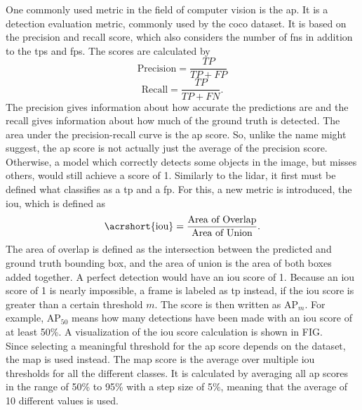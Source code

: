 One commonly used metric in the field of computer vision is the \gls{ap}.
It is a detection evaluation metric, commonly used by the \gls{coco} dataset.
It is based on the precision and recall score, which also considers the number of \glspl{fn} in addition to the \glspl{tp} and \glspl{fp}.
The scores are calculated by
\begin{equation}
	\text{Precision} = \frac{TP}{TP+FP}
\end{equation}
\begin{equation}
	\text{Recall} = \frac{TP}{TP+FN}.
\end{equation}
The precision gives information about how accurate the predictions are and the recall gives information about how much of the ground truth is detected.
The area under the precision-recall curve is the \gls{ap} score.
So, unlike the name might suggest, the \gls{ap} score is not actually just the average of the precision score.
Otherwise, a model which correctly detects some objects in the image, but misses others, would still achieve a score of 1.
Similarly to the \gls{lidar}, it first must be defined what classifies as a \gls{tp} and a \gls{fp}.
For this, a new metric is introduced, the \gls{iou}, which is defined as
\begin{equation}
	\text{\acrshort{iou}} = \frac{\text{Area of Overlap}}{\text{Area of Union}}.
\end{equation}
The area of overlap is defined as the intersection between the predicted and ground truth bounding box, and the area of union is the area of both boxes added together.
A perfect detection would have an \gls{iou} score of 1.
Because an \gls{iou} score of 1 is nearly impossible, a frame is labeled as \gls{tp} instead, if the \gls{iou} score is greater than a certain threshold $m$.
The score is then written as $\text{AP}_{m}$.
For example, $\text{AP}_{50}$ means how many detections have been made with an \gls{iou} score of at least 50\%.
A visualization of the \gls{iou} score calculation is shown in FIG.\\
Since selecting a meaningful threshold for the \gls{ap} score depends on the dataset, the \gls{map} is used instead.
The \gls{map} score is the average over multiple \gls{iou} thresholds for all the different classes.
It is calculated by averaging all \gls{ap} scores in the range of 50\% to 95\% with a step size of 5\%, meaning that the average of 10 different values is used.\\

